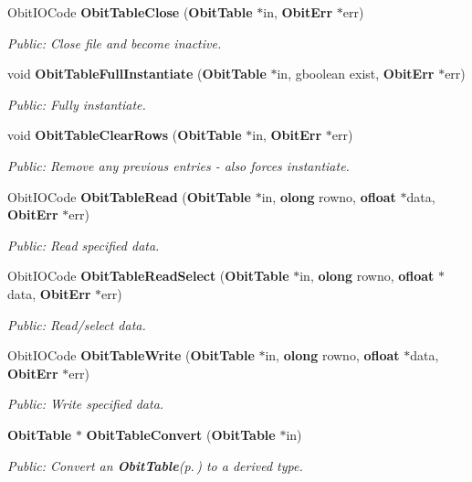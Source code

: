 \begin{CompactItemize}
Obit\-IOCode {\bf Obit\-Table\-Close} ({\bf Obit\-Table} $\ast$in, {\bf Obit\-Err} $\ast$err)
\begin{CompactList}\small\item\em Public: Close file and become inactive. \item\end{CompactList}\item 
void {\bf Obit\-Table\-Full\-Instantiate} ({\bf Obit\-Table} $\ast$in, gboolean exist, {\bf Obit\-Err} $\ast$err)
\begin{CompactList}\small\item\em Public: Fully instantiate. \item\end{CompactList}\item 
void {\bf Obit\-Table\-Clear\-Rows} ({\bf Obit\-Table} $\ast$in, {\bf Obit\-Err} $\ast$err)
\begin{CompactList}\small\item\em Public: Remove any previous entries - also forces instantiate. \item\end{CompactList}\item 
Obit\-IOCode {\bf Obit\-Table\-Read} ({\bf Obit\-Table} $\ast$in, {\bf olong} rowno, {\bf ofloat} $\ast$data, {\bf Obit\-Err} $\ast$err)
\begin{CompactList}\small\item\em Public: Read specified data. \item\end{CompactList}\item 
Obit\-IOCode {\bf Obit\-Table\-Read\-Select} ({\bf Obit\-Table} $\ast$in, {\bf olong} rowno, {\bf ofloat} $\ast$data, {\bf Obit\-Err} $\ast$err)
\begin{CompactList}\small\item\em Public: Read/select data. \item\end{CompactList}\item 
Obit\-IOCode {\bf Obit\-Table\-Write} ({\bf Obit\-Table} $\ast$in, {\bf olong} rowno, {\bf ofloat} $\ast$data, {\bf Obit\-Err} $\ast$err)
\begin{CompactList}\small\item\em Public: Write specified data. \item\end{CompactList}\item 
{\bf Obit\-Table} $\ast$ {\bf Obit\-Table\-Convert} ({\bf Obit\-Table} $\ast$in)
\begin{CompactList}\small\item\em Public: Convert an {\bf Obit\-Table}{\rm (p.\,\pageref{structObitTable})} to a derived type. \item\end{CompactList}\item 

\end{CompactItemize}
